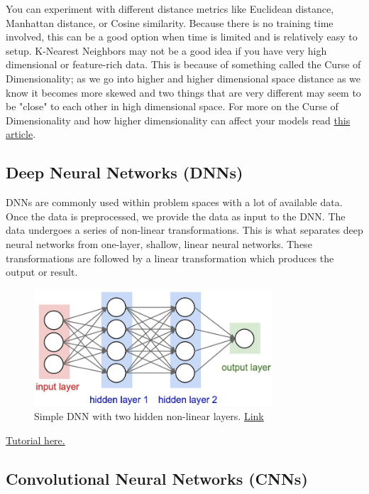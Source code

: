 \documentclass{article}
\begin{document}
You can experiment with different distance metrics like Euclidean distance, Manhattan distance, or Cosine similarity. Because there is no training time involved, this can be a good option when time is limited and is relatively easy to setup. K-Nearest Neighbors may not be a good idea if you have very high dimensional or feature-rich data. This is because of something called the Curse of Dimensionality; as we go into higher and higher dimensional space distance as we know it becomes more skewed and two things that are very different may seem to be "close" to each other in high dimensional space. For more on the Curse of Dimensionality and how higher dimensionality can affect your models read \href{https://towardsdatascience.com/curse-of-dimensionality-2092410f3d27}{this article}.

\newpage
\subsection{Deep Neural Networks (DNNs)} 
DNNs are commonly used within problem spaces with a lot of available data. Once the data is preprocessed, we provide the data as input to the DNN. The data undergoes a series of non-linear transformations. This is what separates deep neural networks from one-layer, shallow, linear neural networks. These transformations are followed by a linear transformation which produces the output or result. 
\begin{figure}[H]
    \centering
    \includegraphics[width=3.5in]{nn.jpg}
    \caption{Simple DNN with two hidden non-linear layers. \href{https://www.digitaltrends.com/cool-tech/what-is-an-artificial-neural-network/}{Link}}
    \label{fig:nn}
\end{figure}

\href{https://playground.tensorflow.org}{Tutorial here.}

\newpage
\subsection{Convolutional Neural Networks (CNNs)} 
\end{document}
